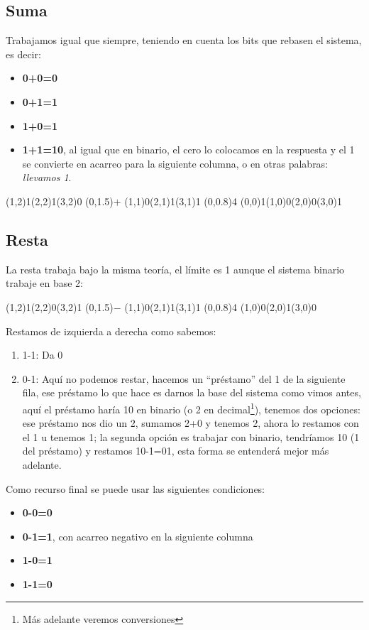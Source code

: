\documentclass[
	12pt, %
	fleqn, %
	a4paper, %
	oneside, %
]{LegrandOrangeBook}
\begin{document}
\subsection{Suma}
Trabajamos igual que siempre, teniendo en cuenta los bits que rebasen el sistema, es decir:
\begin{itemize}
\item \textbf{0+0=0}
\item \textbf{0+1=1}
\item \textbf{1+0=1}
\item \textbf{1+1=10}, al igual que en binario, el cero lo colocamos en la respuesta y el 1 se convierte en acarreo para la siguiente columna, o en otras palabras: \textit{llevamos 1}.
\end{itemize}
\begin{center}
\par\vspace{2\oplineheight}
\oplput(1,2){1}\oplput(2,2){1}\oplput(3,2){0}
\oplput(0,1.5){$+$}
\oplput(1,1){0}\oplput(2,1){1}\oplput(3,1){1}
\ophline(0,0.8){4}
\oplput(0,0){1}\oplput(1,0){0}\oplput(2,0){0}\oplput(3,0){1}
\end{center}
\subsection{Resta}
La resta trabaja bajo la misma teoría, el límite es 1 aunque el sistema binario trabaje en base 2:
\begin{center}
\par\vspace{2\oplineheight}
\oplput(1,2){1}\oplput(2,2){0}\oplput(3,2){1}
\oplput(0,1.5){$-$}
\oplput(1,1){0}\oplput(2,1){1}\oplput(3,1){1}
\ophline(0,0.8){4}
\oplput(1,0){0}\oplput(2,0){1}\oplput(3,0){0}
\end{center}
Restamos de izquierda a derecha como sabemos:
\begin{enumerate}
\item 1-1: Da 0
\item 0-1: Aquí no podemos restar, hacemos un ``préstamo'' del 1 de la siguiente fila, ese préstamo lo que hace es darnos la base del sistema como vimos antes, aquí el préstamo haría 10 en binario (o 2 en decimal\footnote{Más adelante veremos conversiones}), tenemos dos opciones: ese préstamo nos dio un 2, sumamos 2+0 y tenemos 2, ahora lo restamos con el 1 u tenemos 1; la segunda opción es trabajar con binario, tendríamos 10 (1 del préstamo) y restamos 10-1=01, esta forma se entenderá  mejor más adelante.
\end{enumerate}
Como recurso final se puede usar las siguientes condiciones:
\begin{itemize}
\item \textbf{0-0=0}
\item \textbf{0-1=1}, con acarreo negativo en la siguiente columna
\item \textbf{1-0=1}
\item \textbf{1-1=0}
\end{itemize}
\end{document}
